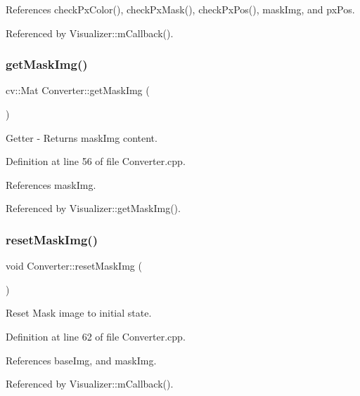 References check\+Px\+Color(), check\+Px\+Mask(), check\+Px\+Pos(), mask\+Img, and px\+Pos.



Referenced by Visualizer\+::m\+Callback().

\mbox{\label{class_converter_a1038402549bb55951554c6b45740137f}} 
\subsubsection{\texorpdfstring{getMaskImg()}{getMaskImg()}}
{\footnotesize\ttfamily cv\+::\+Mat Converter\+::get\+Mask\+Img (\begin{DoxyParamCaption}{ }\end{DoxyParamCaption})}



Getter -\/ Returns \textquotesingle{}mask\+Img\textquotesingle{} content. 



Definition at line 56 of file Converter.\+cpp.



References mask\+Img.



Referenced by Visualizer\+::get\+Mask\+Img().

\mbox{\label{class_converter_a5d4c43bb79d93081b0359b9821ab83ba}} 
\subsubsection{\texorpdfstring{resetMaskImg()}{resetMaskImg()}}
{\footnotesize\ttfamily void Converter\+::reset\+Mask\+Img (\begin{DoxyParamCaption}{ }\end{DoxyParamCaption})}



Reset Mask image to initial state. 



Definition at line 62 of file Converter.\+cpp.



References base\+Img, and mask\+Img.



Referenced by Visualizer\+::m\+Callback().

